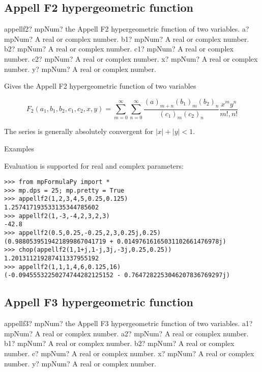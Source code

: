 \subsection{Appell F2 hypergeometric function}

\begin{mpFunctionsExtract}
	\mpFunctionSeven
	{appellf2? mpNum? the Appell F2 hypergeometric function of two variables.}
	{a? mpNum? A real or complex number.}
	{b1? mpNum? A real or complex number.}	
	{b2? mpNum? A real or complex number.}
	{c1? mpNum? A real or complex number.}
	{c2? mpNum? A real or complex number.}		
	{x? mpNum? A real or complex number.}		
	{y? mpNum? A real or complex number.}		
\end{mpFunctionsExtract}

\vpara
Gives the Appell F2 hypergeometric function of two variables

\begin{equation}
F_2(a_1,b_1,b_2,c_1,c_2,x,y) = \sum_{m=0}^{\infty} \sum_{n=0}^{\infty} \frac{(a)_{m+n}(b_1)_m (b_2)_n}{(c_1)_{m}(c_2)_{n}} \frac{x^my^n}{m!,n!}
\end{equation}


The series is generally absolutely convergent for $|x|+|y|<1$.

Examples

Evaluation is supported for real and complex parameters:

\begin{lstlisting}
>>> from mpFormulaPy import *
>>> mp.dps = 25; mp.pretty = True
>>> appellf2(1,2,3,4,5,0.25,0.125)
1.257417193533135344785602
>>> appellf2(1,-3,-4,2,3,2,3)
-42.8
>>> appellf2(0.5,0.25,-0.25,2,3,0.25j,0.25)
(0.9880539519421899867041719 + 0.01497616165031102661476978j)
>>> chop(appellf2(1,1+j,1-j,3j,-3j,0.25,0.25))
1.201311219287411337955192
>>> appellf2(1,1,1,4,6,0.125,16)
(-0.09455532250274744282125152 - 0.7647282253046207836769297j)
\end{lstlisting}




\subsection{Appell F3 hypergeometric function}

\begin{mpFunctionsExtract}
	\mpFunctionSeven
	{appellf3? mpNum? the Appell F3 hypergeometric function of two variables.}
	{a1? mpNum? A real or complex number.}
	{a2? mpNum? A real or complex number.}
	{b1? mpNum? A real or complex number.}	
	{b2? mpNum? A real or complex number.}
	{c? mpNum? A real or complex number.}		
	{x? mpNum? A real or complex number.}		
	{y? mpNum? A real or complex number.}		
\end{mpFunctionsExtract}

